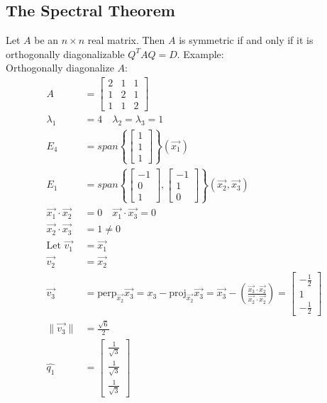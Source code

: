 \documentclass{math}
\begin{document}
\subsection*{The Spectral Theorem}
Let \( A \) be an \( n\times n \) real matrix. Then \( A \) is symmetric if and
only if it is orthogonally diagonalizable \( Q^TAQ = D \). Example: \\
Orthogonally diagonalize \( A \):
\begin{align*}
  A &= \begin{bmatrix}
    2 & 1 & 1 \\
    1 & 2 & 1 \\
    1 & 1 & 2
  \end{bmatrix} \\
  \lambda_1 &= 4 \quad \lambda_2 = \lambda_3 = 1 \\
  E_4 &= span\left\{\begin{bmatrix}1 \\ 1 \\ 1\end{bmatrix}\right\}
    (\vec{x_1}) \\
  E_1 &= span\left\{
    \begin{bmatrix}-1 \\ 0 \\ 1\end{bmatrix},
    \begin{bmatrix}-1 \\ 1 \\ 0\end{bmatrix}
  \right\} (\vec{x_2},\vec{x_3}) \\
  \vec{x_1}\cdot\vec{x_2} &= 0 \quad \vec{x_1}\cdot\vec{x_3} = 0 \\
  \vec{x_2}\cdot\vec{x_3} &= 1 \ne 0 \\
  \text{Let } \vec{v_1} &= \vec{x_1} \\
  \vec{v_2} &= \vec{x_2} \\
  \vec{v_3} &= \text{perp}_{\vec{x_2}}\vec{x_3} =
    x_3-\text{proj}_{\vec{x_2}}\vec{x_3} =
    \vec{x_3}-\left(\frac{\vec{x_3}\cdot\vec{x_2}}
      {\vec{x_2}\cdot\vec{x_2}}\right) =
    \begin{bmatrix}-\frac{1}{2} \\ 1 \\ -\frac{1}{2}\end{bmatrix} \\
  \|\vec{v_3}\| &= \frac{\sqrt{6}}{2} \\
  \hat{q_1} &= \begin{bmatrix}
    \frac{1}{\sqrt{3}} \\ \frac{1}{\sqrt{3}} \\ \frac{1}{\sqrt{3}}

\end{bmatrix}
\end{align*}
\end{document}
